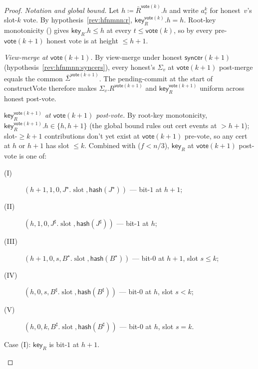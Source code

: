 \documentclass{article}
\newcommand{\slot}[0]{\ensuremath{\operatorname{\mathrm{slot}}}}
\newcommand{\hash}{\mathsf{hash}}
\newcommand{\key}{\mathsf{key}}
\newcommand{\syncer}{\mathsf{syncer}}
\newcommand{\vote}{\mathsf{vote}}
\newcommand{\comm}[1]{\bar{#1}}
\newcommand{\constructVote}{\textsf{constructVote}\xspace}
\theoremstyle{plain}
\theoremstyle{definition}
\theoremstyle{remark}
\begin{document}
\begin{proof}
\emph{Notation and global bound.}
Let $h \coloneqq \comm{R}^{\vote(k)}.h$ and write $a^k_v$ for honest~$v$'s slot-$k$ vote. By hypothesis~\ref{rev:hfnmnn:r}, $\key_R^{\vote(k)}.h = h$. Root-key monotonicity () gives $\key_R.h \leq h$ at every $t \leq \vote(k)$, so by  every pre-$\vote(k+1)$ honest vote is at height $\leq h+1$.

\emph{View-merge at $\vote(k+1)$.}
By view-merge under honest $\syncer(k+1)$ (hypothesis~\ref{rev:hfnmnn:syncers}), every honest's $\Sigma_v$ at $\vote(k+1)$ post-merge equals the common $\comm{\Sigma}^{\vote(k+1)}$. The pending-commit at the start of \constructVote{} therefore makes $\Sigma_v.R^{\vote(k+1)}$ and $\key_R^{\vote(k+1)}$ uniform across honest post-vote.

\emph{$\key_R^{\vote(k+1)}$ at $\vote(k+1)$ post-vote.}
By root-key monotonicity, $\key_R^{\vote(k+1)}.h \in \{h, h+1\}$ (the global bound rules out cert events at $> h+1$); slot-$\geq k+1$ contributions don't yet exist at $\vote(k+1)$ pre-vote, so any cert at $h$ or $h+1$ has slot $\leq k$. Combined with  ($f<n/3$), $\key_R$ at $\vote(k+1)$ post-vote is one of:
\begin{description}
  \item[(I)] $(h+1, 1, 0, J^\star.\slot, \hash(J^\star))$ — bit-$1$ at $h+1$;
  \item[(II)] $(h, 1, 0, J^\sharp.\slot, \hash(J^\sharp))$ — bit-$1$ at $h$;
  \item[(III)] $(h+1, 0, s, B^\star.\slot, \hash(B^\star))$ — bit-$0$ at $h+1$, slot $s \leq k$;
  \item[(IV)] $(h, 0, s, B^\sharp.\slot, \hash(B^\sharp))$ — bit-$0$ at $h$, slot $s < k$;
  \item[(V)] $(h, 0, k, B^\sharp.\slot, \hash(B^\sharp))$ — bit-$0$ at $h$, slot $s = k$.
\end{description}

\begin{description}
\item[{Case (I): $\key_R$ is bit-$1$ at $h+1$.}]\hfill


\end{description}
\end{proof}
\end{document}
